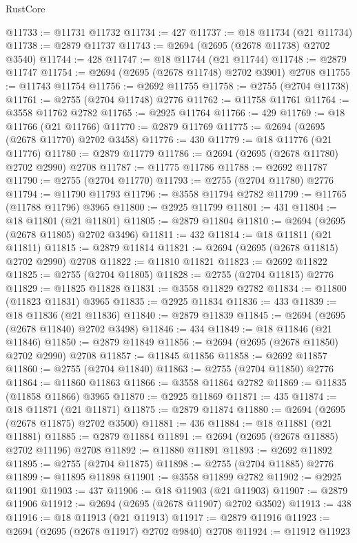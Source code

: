 \begin{lexlean}{RustCore}
\begin{coremodule}
@11733 := @11731 @11732
@11734 := 427
@11737 := @18 @11734 (@21 @11734)
@11738 := @2879 @11737
@11743 := @2694 (@2695 (@2678 @11738) @2702 @3540)
@11744 := 428
@11747 := @18 @11744 (@21 @11744)
@11748 := @2879 @11747
@11754 := @2694 (@2695 (@2678 @11748) @2702 @3901) @2708
@11755 := @11743 @11754
@11756 := @2692 @11755
@11758 := @2755 (@2704 @11738)
@11761 := @2755 (@2704 @11748) @2776
@11762 := @11758 @11761
@11764 := @3558 @11762 @2782
@11765 := @2925 @11764
@11766 := 429
@11769 := @18 @11766 (@21 @11766)
@11770 := @2879 @11769
@11775 := @2694 (@2695 (@2678 @11770) @2702 @3458)
@11776 := 430
@11779 := @18 @11776 (@21 @11776)
@11780 := @2879 @11779
@11786 := @2694 (@2695 (@2678 @11780) @2702 @2990) @2708
@11787 := @11775 @11786
@11788 := @2692 @11787
@11790 := @2755 (@2704 @11770)
@11793 := @2755 (@2704 @11780) @2776
@11794 := @11790 @11793
@11796 := @3558 @11794 @2782
@11799 := @11765 (@11788 @11796) @3965
@11800 := @2925 @11799
@11801 := 431
@11804 := @18 @11801 (@21 @11801)
@11805 := @2879 @11804
@11810 := @2694 (@2695 (@2678 @11805) @2702 @3496)
@11811 := 432
@11814 := @18 @11811 (@21 @11811)
@11815 := @2879 @11814
@11821 := @2694 (@2695 (@2678 @11815) @2702 @2990) @2708
@11822 := @11810 @11821
@11823 := @2692 @11822
@11825 := @2755 (@2704 @11805)
@11828 := @2755 (@2704 @11815) @2776
@11829 := @11825 @11828
@11831 := @3558 @11829 @2782
@11834 := @11800 (@11823 @11831) @3965
@11835 := @2925 @11834
@11836 := 433
@11839 := @18 @11836 (@21 @11836)
@11840 := @2879 @11839
@11845 := @2694 (@2695 (@2678 @11840) @2702 @3498)
@11846 := 434
@11849 := @18 @11846 (@21 @11846)
@11850 := @2879 @11849
@11856 := @2694 (@2695 (@2678 @11850) @2702 @2990) @2708
@11857 := @11845 @11856
@11858 := @2692 @11857
@11860 := @2755 (@2704 @11840)
@11863 := @2755 (@2704 @11850) @2776
@11864 := @11860 @11863
@11866 := @3558 @11864 @2782
@11869 := @11835 (@11858 @11866) @3965
@11870 := @2925 @11869
@11871 := 435
@11874 := @18 @11871 (@21 @11871)
@11875 := @2879 @11874
@11880 := @2694 (@2695 (@2678 @11875) @2702 @3500)
@11881 := 436
@11884 := @18 @11881 (@21 @11881)
@11885 := @2879 @11884
@11891 := @2694 (@2695 (@2678 @11885) @2702 @11196) @2708
@11892 := @11880 @11891
@11893 := @2692 @11892
@11895 := @2755 (@2704 @11875)
@11898 := @2755 (@2704 @11885) @2776
@11899 := @11895 @11898
@11901 := @3558 @11899 @2782
@11902 := @2925 @11901
@11903 := 437
@11906 := @18 @11903 (@21 @11903)
@11907 := @2879 @11906
@11912 := @2694 (@2695 (@2678 @11907) @2702 @3502)
@11913 := 438
@11916 := @18 @11913 (@21 @11913)
@11917 := @2879 @11916
@11923 := @2694 (@2695 (@2678 @11917) @2702 @9840) @2708
@11924 := @11912 @11923

\end{coremodule}
\end{lexlean}
